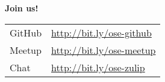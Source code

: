 \begin{frame}
\textbf{Join us!}\\\vspace{0.5cm}
\begin{tabular}{ll}
GitHub		& \url{http://bit.ly/ose-github}\\
Meetup    & \url{http://bit.ly/ose-meetup}\\
Chat      & \url{http://bit.ly/ose-zulip} \\
\end{tabular}
\end{frame}
